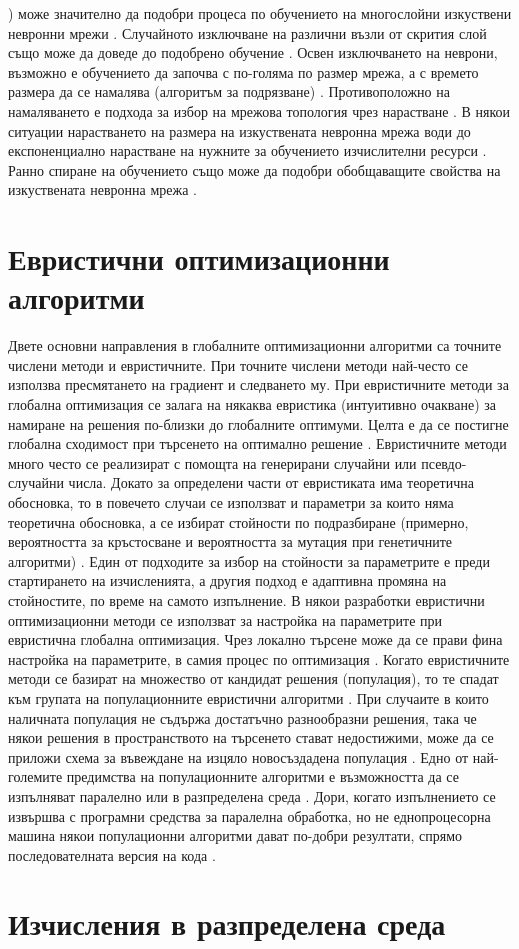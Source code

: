 \cite{Zur-01}) може значително да подобри процеса по обучението на многослойни изкуствени невронни мрежи \cite{Sietsma-01}. Случайното изключване на различни възли от скрития слой също може да доведе до подобрено обучение \cite{Sequin-01}. Освен изключването на неврони, възможно е обучението да започва с по-голяма по размер мрежа, а с времето размера да се намалява (алгоритъм за подрязване) \cite{Karnin-01}. Противоположно на намаляването е подхода за избор на мрежова топология чрез нарастване \cite{Yao-01}. В някои ситуации нарастването на размера на изкуствената невронна мрежа води до експоненциално нарастване на нужните за обучението изчислителни ресурси \cite{Wilamowski-01}. Ранно спиране на обучението също може да подобри обобщаващите свойства на изкуствената невронна мрежа \cite{Coulibaly-01}.

\section{Евристични оптимизационни алгоритми}

Двете основни направления в глобалните оптимизационни алгоритми са точните числени методи и евристичните. При точните числени методи най-често се използва пресмятането на градиент и следването му. При евристичните методи за глобална оптимизация се залага на някаква евристика (интуитивно очакване) за намиране на решения по-близки до глобалните оптимуми. Целта е да се постигне глобална сходимост при търсенето на оптимално решение \cite{Beyer-01}. Евристичните методи много често се реализират с помощта на генерирани случайни или псевдо-случайни числа. Докато за определени части от евристиката има теоретична обосновка, то в повечето случаи се използват и параметри за които няма теоретична обосновка, а се избират стойности по подразбиране (примерно, вероятността за кръстосване и вероятността за мутация при генетичните алгоритми) \cite{Eiben-01}. Един от подходите за избор на стойности за параметрите е преди стартирането на изчисленията, а другия подход е адаптивна промяна на стойностите, по време на самото изпълнение. В някои разработки евристични оптимизационни методи се използват за настройка на параметрите при евристична глобална оптимизация. Чрез локално търсене може да се прави фина настройка на параметрите, в самия процес по оптимизация \cite{Karafotias-01}. Когато евристичните методи се базират на множество от кандидат решения (популация), то те спадат към групата на популационните евристични алгоритми \cite{Whitley-01}. При случаите в които наличната популация не съдържа достатъчно разнообразни решения, така че някои решения в пространството на търсенето стават недостижими, може да се приложи схема за въвеждане на изцяло новосъздадена популация \cite{Wegener-01}. Едно от най-големите предимства на популационните алгоритми е възможността да се изпълняват паралелно или в разпределена среда \cite{Vikhar-01}. Дори, когато изпълнението се извършва с програмни средства за паралелна обработка, но не еднопроцесорна машина някои популационни алгоритми дават по-добри резултати, спрямо последователната версия на кода \cite{Alba-01}.

\section{Изчисления в разпределена среда}


